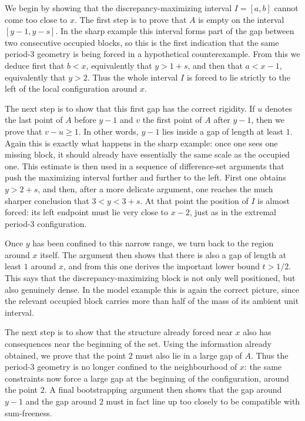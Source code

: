 \documentclass[11pt,reqno]{amsart}
\theoremstyle{definition}
\begin{document}
We begin by showing that the discrepancy-maximizing interval $I=[a,b]$ cannot come too close to $x$. The first step is to prove that $A$ is empty on the interval $[y-1,y-s]$. In the sharp example this interval forms part of the gap between two consecutive occupied blocks, so this is the first indication that the same period-3 geometry is being forced in a hypothetical counterexample. From this we deduce first that $b<x$, equivalently that $y>1+s$, and then that $a<x-1$, equivalently that $y>2$. Thus the whole interval $I$ is forced to lie strictly to the left of the local configuration around $x$.

The next step is to show that this first gap has the correct rigidity. If $u$ denotes the last point of $A$ before $y-1$ and $v$ the first point of $A$ after $y-1$, then we prove that $v-u\geq 1$. In other words, $y-1$ lies inside a gap of length at least $1$. Again this is exactly what happens in the sharp example: once one sees one missing block, it should already have essentially the same scale as the occupied one. This estimate is then used in a sequence of difference-set arguments that push the maximizing interval further and further to the left. First one obtains $y>2+s$, and then, after a more delicate argument, one reaches the much sharper conclusion that $3<y<3+s$. At that point the position of $I$ is almost forced: its left endpoint must lie very close to $x-2$, just as in the extremal period-3 configuration.

Once $y$ has been confined to this narrow range, we turn back to the region around $x$ itself. The argument then shows that there is also a gap of length at least $1$ around $x$, and from this one derives the important lower bound $t>1/2$. This says that the discrepancy-maximizing block is not only well positioned, but also genuinely dense. In the model example this is again the correct picture, since the relevant occupied block carries more than half of the mass of its ambient unit interval.

The next step is to show that the structure already forced near $x$ also has consequences near the beginning of the set. Using the information already obtained, we prove that the point $2$ must also lie in a large gap of $A$. Thus the period-3 geometry is no longer confined to the neighbourhood of $x$: the same constraints now force a large gap at the beginning of the configuration, around the point $2$. A final bootstrapping argument then shows that the gap around $y-1$ and the gap around $2$ must in fact line up too closely to be compatible with sum-freeness.
\end{document}

